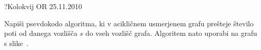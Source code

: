 \begin{naloga}{?}{Kolokvij OR 25.11.2010}
\begin{vprasanje}
Napiši psevdokodo algoritma,
ki v acikličnem usmerjenem grafu prešteje število poti
od danega vozlišča $s$ do vseh vozlišč grafa.
Algoritem nato uporabi na grafu s slike~\fig{}.

\begin{slika}
\pgfslika
{}
\end{slika}
\end{vprasanje}
\begin{odgovor}
\end{odgovor}
\end{naloga}
